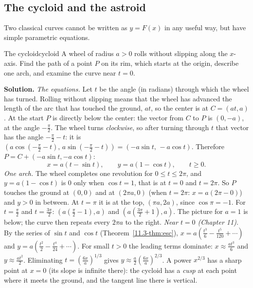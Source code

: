 \documentclass[11pt]{article}
\begin{document}
\subsection*{The cycloid and the astroid}

Two classical curves cannot be written as $y=F(x)$ in any useful way, but have simple parametric equations.

\begin{exmp}{The cycloid}{cycloid}
A wheel of radius $a>0$ rolls without slipping along the $x$-axis. Find the path of a point $P$ on its rim, which starts at the origin, describe one arch, and examine the curve near $t=0$.

\textbf{Solution.} \emph{The equations.} Let $t$ be the angle (in radians) through which the wheel has turned. Rolling without slipping means that the wheel has advanced the length of the arc that has touched the ground, $at$, so the center is at $C=(at,a)$. At the start $P$ is directly below the center: the vector from $C$ to $P$ is $(0,-a)$, at the angle $-\frac\pi2$. The wheel turns \emph{clockwise}, so after turning through $t$ that vector has the angle $-\frac\pi2-t$: it is $\left(a\cos(-\tfrac\pi2-t),\,a\sin(-\tfrac\pi2-t)\right)=(-a\sin t,\,-a\cos t)$. Therefore $P=C+(-a\sin t,-a\cos t)$:
\[
x=a(t-\sin t),\qquad y=a(1-\cos t),\qquad t\ge0.
\]
\emph{One arch.} The wheel completes one revolution for $0\le t\le2\pi$, and $y=a(1-\cos t)$ is $0$ only when $\cos t=1$, that is at $t=0$ and $t=2\pi$. So $P$ touches the ground at $(0,0)$ and at $(2\pi a,0)$ (when $t=2\pi$: $x=a(2\pi-0)$) and $y>0$ in between. At $t=\pi$ it is at the top, $(\pi a,2a)$, since $\cos\pi=-1$. For $t=\frac\pi2$ and $t=\frac{3\pi}2$: $(a(\frac\pi2-1),a)$ and $(a(\frac{3\pi}2+1),a)$. The picture for $a=1$ is below; the curve then repeats every $2\pi a$ to the right.
\emph{Near $t=0$ (Chapter 11).} By the series of $\sin t$ and $\cos t$ (Theorem~\ref{11.3-thm:esc}), $x=a\left(\frac{t^3}6-\frac{t^5}{120}+\cdots\right)$ and $y=a\left(\frac{t^2}2-\frac{t^4}{24}+\cdots\right)$. For small $t>0$ the leading terms dominate: $x\approx\frac{at^3}6$ and $y\approx\frac{at^2}2$. Eliminating $t=\left(\frac{6x}a\right)^{1/3}$ gives $y\approx\frac a2\left(\frac{6x}a\right)^{2/3}$. A power $x^{2/3}$ has a sharp point at $x=0$ (its slope is infinite there): the cycloid has a \emph{cusp} at each point where it meets the ground, and the tangent line there is vertical.
\end{exmp}
\end{document}
